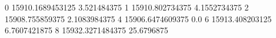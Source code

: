 0 15910.1689453125 3.521484375
1 15910.802734375 4.1552734375
2 15908.755859375 2.1083984375
4 15906.6474609375 0.0
6 15913.408203125 6.7607421875
8 15932.3271484375 25.6796875
